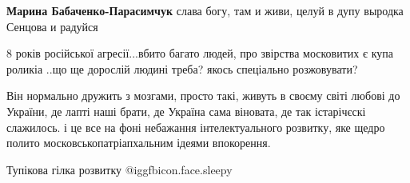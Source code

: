 \begin{itemize}
\begin{itemize} %
\textbf{Марина Бабаченко-Парасимчук} слава богу, там и живи, целуй в дупу выродка Сенцова и радуйся
\end{itemize} %


8 років російської агресії...вбито багато людей, про звірства московитих є купа
роликіа ..що ще дорослій людині треба? якось спеціально розжовувати?

Він нормально дружить з мозгами, просто такі, живуть в своєму світі любові до
України, де лапті наші брати, де Україна сама віновата, де так істарічєскі
слажилось. і це все на фоні небажання інтелектуального розвитку, яке щедро
полито московськопатріапхальним ідеями впокорення.

Тупікова гілка розвитку @igg{fbicon.face.sleepy} 


\end{itemize} %

